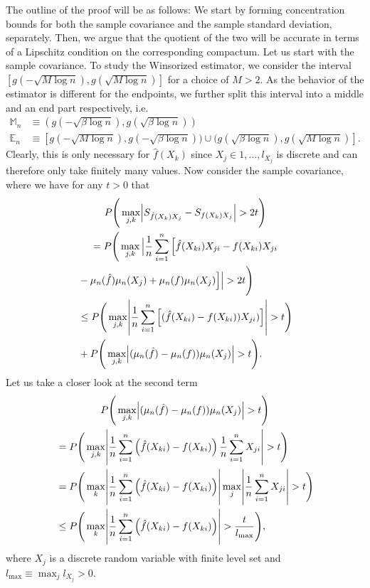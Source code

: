 The outline of the proof will be as follows: We start by forming concentration bounds for both the sample covariance and the sample standard deviation, separately. Then, we argue that the quotient of the two will be accurate in terms of a Lipschitz condition on the corresponding compactum. Let us start with the sample covariance. To study the Winsorized estimator, we consider the interval $[g(-\sqrt{M\log n}), g(\sqrt{M\log n})]$ for a choice of $M>2$. As the behavior of the estimator is different for the endpoints, we further split this interval into a middle and an end part respectively, i.e.
\begin{equation*}
    \begin{split}
        \mathbb{M}_n &\equiv (g(-\sqrt{\beta\log n}), g(\sqrt{\beta\log n})) \\
        \mathbb{E}_n &\equiv [g(-\sqrt{M\log n}), g(-\sqrt{\beta\log n})) \cup (g(\sqrt{\beta\log n}), g(\sqrt{M\log n})].
    \end{split}
\end{equation*}
Clearly, this is only necessary for $\hat{f}(X_k)$ since $X_j \in 1, \dots, l_{X_j}$ is discrete and can therefore only take finitely many values. Now consider the sample covariance, where we have for any $t > 0$ that
\begin{multline*}
        P\Bigg(\max_{j,k} \abs{S_{\hat{f}(X_k)X_j} - S_{f(X_k)X_j}} > 2t \Bigg) \\
        = P\Bigg(\max_{j,k} \Big\lvert\frac{1}{n}\sum_{i=1}^n \Big[\hat{f}(X_{ki})X_{ji} - f(X_{ki})X_{ji} \\
        \begin{aligned}
        &- \mu_n(\hat{f})\mu_n(X_j) + \mu_n(f)\mu_n(X_j)\Big]\Big\rvert > 2t \Bigg) \\
        &\leq P\Bigg(\max_{j,k}\abs{\frac{1}{n}\sum_{i=1}^n \Big[(\hat{f}(X_{ki}) - f(X_{ki}))X_{ji})\Big]} > t \Bigg) \\
        &+ P\Bigg(\max_{j,k}\abs{(\mu_n(\hat{f}) - \mu_n(f))\mu_n(X_j)} > t \Bigg).
        \end{aligned}
\end{multline*}
Let us take a closer look at the second term
\begin{multline*}
        P\Bigg(\max_{j,k}\abs{(\mu_n(\hat{f}) - \mu_n(f))\mu_n(X_j)} > t \Bigg) \\
        \begin{aligned}
        &= P\Bigg(\max_{j,k}\abs{ \frac{1}{n}\sum_{i=1}^n \left(\hat{f}(X_{ki}) - f(X_{ki})\right) \frac{1}{n}\sum_{i=1}^n X_{ji} } > t \Bigg) \\
        &= P\Bigg(\max_{k}\abs{ \frac{1}{n}\sum_{i=1}^n \left(\hat{f}(X_{ki}) - f(X_{ki})\right)} \max_{j} \abs{\frac{1}{n}\sum_{i=1}^n X_{ji}}  > t \Bigg) \\
        &\leq P\Bigg(\max_{k}\abs{ \frac{1}{n}\sum_{i=1}^n \left(\hat{f}(X_{ki}) - f(X_{ki})\right)} > \frac{t}{l_{\max}} \Bigg),
        \end{aligned}
\end{multline*}
where $X_j$ is a discrete random variable with finite level set and $l_{\max} \equiv \max_j l_{X_j} > 0$.  

